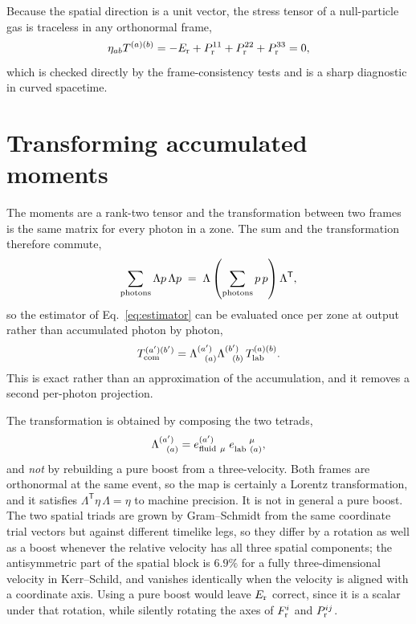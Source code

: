 \documentclass[11pt]{article}
\begin{document}
Because the spatial direction is a unit vector, the stress tensor of a null-particle gas is
traceless in any orthonormal frame,
\begin{equation}
  \eta_{ab} T^{(a)(b)} = -E_{\rm r} + P_{\rm r}^{11} + P_{\rm r}^{22} + P_{\rm r}^{33} = 0 ,
  \label{eq:traceless}
\end{equation}
which is checked directly by the frame-consistency tests and is a sharp diagnostic in
curved spacetime.

\section{Transforming accumulated moments}
\label{sec:transform}

The moments are a rank-two tensor and the transformation between two frames is the same
matrix for every photon in a zone. The sum and the transformation therefore commute,
\begin{equation}
  \sum_{\rm photons} \Lambda p \, \Lambda p
  \;=\; \Lambda \left( \sum_{\rm photons} p \, p \right) \Lambda^{\mathsf T} ,
\end{equation}
so the estimator of Eq.~\eqref{eq:estimator} can be evaluated once per zone at output
rather than accumulated photon by photon,
\begin{equation}
  T^{(a')(b')}_{\rm com} = \Lambda^{(a')}_{\ \ (a)} \Lambda^{(b')}_{\ \ (b)} \, T^{(a)(b)}_{\rm lab} .
\end{equation}
This is exact rather than an approximation of the accumulation, and it removes a second
per-photon projection.

The transformation is obtained by composing the two tetrads,
\begin{equation}
  \Lambda^{(a')}_{\ \ (a)} = e^{(a')}_{{\rm fluid}\ \mu} \; e_{{\rm lab}\ (a)}^{\ \ \ \ \mu} ,
\end{equation}
and \emph{not} by rebuilding a pure boost from a three-velocity. Both frames are
orthonormal at the same event, so the map is certainly a Lorentz transformation, and it
satisfies $\Lambda^{\mathsf T} \eta \, \Lambda = \eta$ to machine precision. It is not in
general a pure boost. The two spatial triads are grown by Gram--Schmidt from the same
coordinate trial vectors but against different timelike legs, so they differ by a rotation
as well as a boost whenever the relative velocity has all three spatial components; the
antisymmetric part of the spatial block is $6.9\%$ for a fully three-dimensional velocity
in Kerr--Schild, and vanishes identically when the velocity is aligned with a coordinate
axis. Using a pure boost would leave $E_{\rm r}$ correct, since it is a scalar under that
rotation, while silently rotating the axes of $F_{\rm r}^i$ and $P_{\rm r}^{ij}$.
\end{document}
